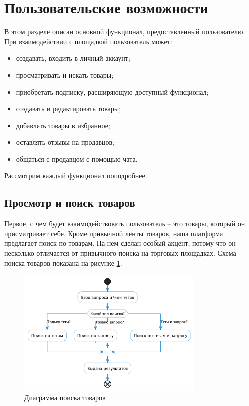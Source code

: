 \documentclass[a4paper,14pt]{extarticle}
\begin{document}
\section{Пользовательские возможности}

В этом разделе описан основной функционал, предоставленный пользователю. При взаимодействии с площадкой пользователь может:
\begin{itemize}
    \item создавать, входить в личный аккаунт;
    \item просматривать и искать товары;
    \item приобретать подписку, расширяющую доступный функционал;
    \item создавать и редактировать товары;
    \item добавлять товары в избранное;
    \item оставлять отзывы на продавцов;
    \item общаться с продавцом с помощью чата.
\end{itemize}
Рассмотрим каждый функционал поподробнее.

\subsection{Просмотр и поиск товаров}

Первое, с чем будет взаимодействовать пользователь -- это товары, который он присматривает себе. Кроме привычной ленты товаров, наша платформа предлагает поиск по товарам. На нем сделан особый акцент, потому что он несколько отличается от привычного поиска на торговых площадках. Схема поиска товаров показана на рисунке \ref{fig:search}.

\begin{figure}[H]
    \centering
    \includegraphics[width=0.8\textwidth]{images/search.png}
    \caption{Диаграмма поиска товаров}
    \label{fig:search}
\end{figure}
\end{document}
